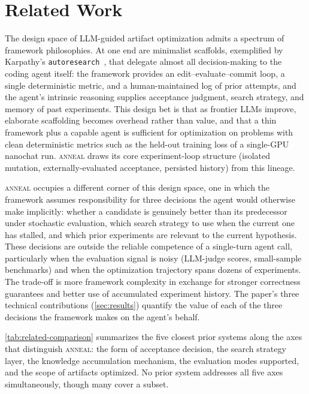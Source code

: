 \section{Related Work}
\label{sec:related_work}

The design space of LLM-guided artifact optimization admits a spectrum of framework philosophies.
At one end are minimalist scaffolds, exemplified by Karpathy's \texttt{autoresearch}~\cite{karpathy2025autoresearch}, that delegate almost all decision-making to the coding agent itself: the framework provides an edit--evaluate--commit loop, a single deterministic metric, and a human-maintained log of prior attempts, and the agent's intrinsic reasoning supplies acceptance judgment, search strategy, and memory of past experiments.
This design bet is that as frontier LLMs improve, elaborate scaffolding becomes overhead rather than value, and that a thin framework plus a capable agent is sufficient for optimization on problems with clean deterministic metrics such as the held-out training loss of a single-GPU nanochat run.
\textsc{anneal} draws its core experiment-loop structure (isolated mutation, externally-evaluated acceptance, persisted history) from this lineage.

\textsc{anneal} occupies a different corner of this design space, one in which the framework assumes responsibility for three decisions the agent would otherwise make implicitly: whether a candidate is genuinely better than its predecessor under stochastic evaluation, which search strategy to use when the current one has stalled, and which prior experiments are relevant to the current hypothesis.
These decisions are outside the reliable competence of a single-turn agent call, particularly when the evaluation signal is noisy (LLM-judge scores, small-sample benchmarks) and when the optimization trajectory spans dozens of experiments.
The trade-off is more framework complexity in exchange for stronger correctness guarantees and better use of accumulated experiment history.
The paper's three technical contributions (\cref{sec:results}) quantify the value of each of the three decisions the framework makes on the agent's behalf.

\cref{tab:related-comparison} summarizes the five closest prior systems along the axes that distinguish \textsc{anneal}: the form of acceptance decision, the search strategy layer, the knowledge accumulation mechanism, the evaluation modes supported, and the scope of artifacts optimized.
No prior system addresses all five axes simultaneously, though many cover a subset.

